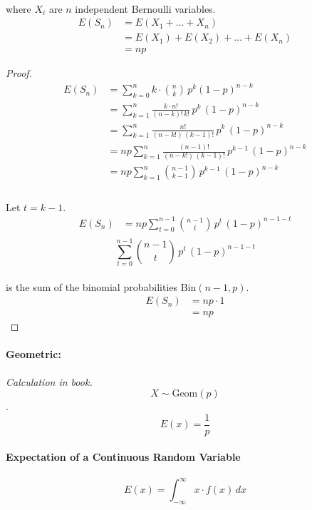 \documentclass[letterpaper,12pt]{article}
\begin{document}
\paragraph{} where $X_i$ are $n$ independent Bernoulli variables.
\begin{align*}
    E(S_n) &= E(X_1 + \ldots + X_n)\\
           &= E(X_1) + E(X_2) + \ldots + E(X_n)\\
           &= np
\end{align*}
\begin{proof}
    \begin{align*}
        E(S_n) &= \sum_{k=0}^n k \cdot \binom{n}{k}\,p^k (1-p)^{n-k}\\
               &= \sum_{k=1}^n \frac{k\cdot n!}{(n-k)! \,k!} \,p^k\,(1-p)^{n-k}\\
               &= \sum_{k=1}^n \frac{n!}{(n-k!)\,(k-1)!}\,p^k\,(1-p)^{n-k}\\
               &= np \sum_{k=1}^n \frac{(n-1)!}{(n-k!)\,(k-1)!}\,p^{k-1}\,(1-p)^{n-k}\\
               &= np \sum_{k=1}^n \binom{n-1}{k-1} \,p^{k-1} \, (1-p)^{n-k}\\
    \end{align*}
    \paragraph{}Let $t = k-1$.
    \begin{align*}
        E(S_n) &=  np \sum_{t=0}^{n-1} \binom{n-1}{t} \,p^{t} \, (1-p)^{n-1-t}\\
    \end{align*}
    $$\sum_{t=0}^{n-1} \binom{n-1}{t} \,p^{t} \, (1-p)^{n-1-t}$$
    \paragraph{}is the sum of the binomial probabilities $\mathrm{Bin}(n-1,p)$.
    \begin{align*}
        E(S_n) &=  np \cdot 1\\
               &= np
    \end{align*}
\end{proof}
    \paragraph{Geometric:}\emph{Calculation in book.}$$X \sim \mathrm{Geom}(p)$$.
\[
    E(x) = \frac{1}{p}
\]

\paragraph{Expectation of a Continuous Random Variable}
\[
    E(x) = \int_{-\infty}^{\infty}x \cdot f(x)\,dx
\]
\end{document}
